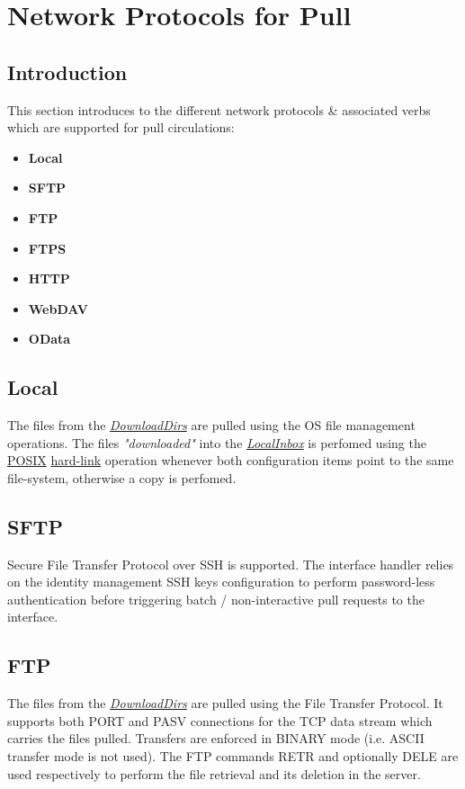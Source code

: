 \documentclass[dec_sum_main.tex]{subfiles}
\begin{document}
\section{Network Protocols for Pull}

\subsection{Introduction}
This section introduces to the different network protocols \& associated verbs which are supported for pull circulations:

\begin{itemize}
	\item \textbf{Local}
	\item \textbf{SFTP}
	\item \textbf{FTP}
	\item \textbf{FTPS}
	\item \textbf{HTTP}
	\item \textbf{WebDAV}
	\item \textbf{OData}
\end{itemize}

\subsection{Local}
The files from the \hyperref[DownloadDirs]{\textit{DownloadDirs}} are 
pulled using the OS file management operations. 
The files \textit{"downloaded"} into the \hyperref[LocalInbox]{\textit{LocalInbox}} is perfomed using the \hyperlink{https://en.wikipedia.org/wiki/POSIX}{POSIX} \hyperlink{https://en.wikipedia.org/wiki/Hard_link}{hard-link} operation whenever both configuration items point to the same file-system, otherwise a copy is perfomed.

\subsection{SFTP}
Secure File Transfer Protocol over SSH is supported. The interface handler relies on the identity management SSH keys configuration to perform password-less authentication before triggering batch / non-interactive pull requests to the interface.

\subsection{FTP}
The files from the \hyperref[DownloadDirs]{\textit{DownloadDirs}} are 
pulled using the File Transfer Protocol. It supports both PORT and PASV connections for the TCP data stream which carries the files pulled. Transfers are enforced in BINARY mode (i.e. ASCII transfer mode is not used). The FTP commands RETR and optionally DELE are used respectively to perform the file retrieval and its deletion in the server.
\end{document}
